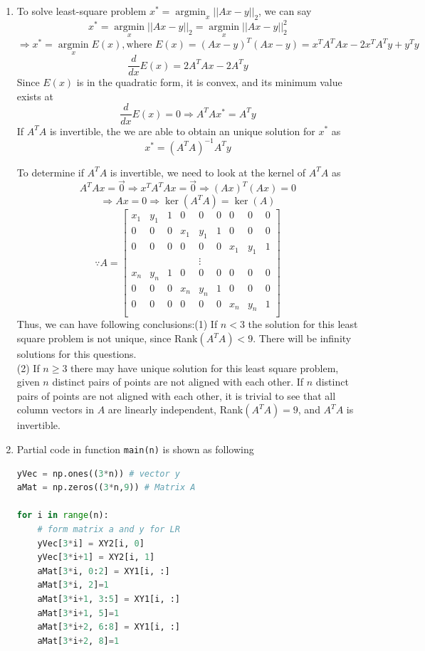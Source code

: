 \documentclass[12pt]{article}
\begin{document}
\begin{enumerate}
\begin{enumerate}
			\item To solve least-square problem $x^*=\operatorname*{argmin}_x||Ax-y||_2$, we can say
			$$x^*=\operatorname*{argmin}_x||Ax-y||_2=\operatorname*{argmin}_x||Ax-y||_2^2$$
			$$\Rightarrow x^*=\operatorname*{argmin}_xE(x), \text{where }E(x)= (Ax-y)^T(Ax-y)= x^TA^TAx-2x^TA^Ty+y^Ty$$
			$$\frac{d}{dx}E(x)=2A^TAx-2A^Ty$$
			Since $E(x)$ is in the quadratic form, it is convex, and its minimum value exists at 
			$$\frac{d}{dx}E(x)=0\Rightarrow A^TAx^*=A^Ty$$
			If $A^TA$ is invertible, the we are able to obtain an unique solution for $x^*$ as
			$$x^*=(A^TA)^{-1}A^Ty$$
			
			To determine if $A^TA$ is invertible, we need to look at the kernel of $A^TA$ as
			$$A^TAx=\vec{0}\Rightarrow x^TA^TAx=\vec{0}\Rightarrow(Ax)^T(Ax)=0$$
			$$\Rightarrow Ax=0\Rightarrow \ker(A^TA)=\ker(A)$$
			$$\because A=\begin{bmatrix}
			x_1 & y_1 & 1 & 0 & 0 & 0 & 0 & 0 & 0\\
			0 & 0 & 0 & x_1 & y_1 & 1 &  0 & 0 & 0\\
			0 & 0 & 0 & 0 & 0 & 0 & x_1 & y_1 & 1 \\
			&&&&\vdots\\
			x_n & y_n & 1 & 0 & 0 & 0 & 0 & 0 & 0\\
			0 & 0 & 0 & x_n & y_n & 1 &  0 & 0 & 0\\
			0 & 0 & 0 & 0 & 0 & 0 & x_n & y_n & 1 \\
			\end{bmatrix}$$
			Thus, we can have following conclusions:(1) If $n<3$ the solution for this least square problem is not unique, since Rank$(A^TA)<9$. There will be infinity solutions for this questions.\\
			(2) If $n\geq 3$ there may have unique solution for this least square problem, given $n$ distinct pairs of points are not aligned with each other. If $n$ distinct pairs of points are not aligned with each other, it is trivial to see that all column vectors in $A$ are linearly independent, Rank$(A^TA)=9$, and $A^TA$ is invertible. \\
					
			\item Partial code in function \texttt{main(n)} is shown as following
			\begin{lstlisting}[language=Python]
yVec = np.ones((3*n)) # vector y
aMat = np.zeros((3*n,9)) # Matrix A

for i in range(n): 
	# form matrix a and y for LR
	yVec[3*i] = XY2[i, 0]
	yVec[3*i+1] = XY2[i, 1]
	aMat[3*i, 0:2] = XY1[i, :]
	aMat[3*i, 2]=1
	aMat[3*i+1, 3:5] = XY1[i, :]
	aMat[3*i+1, 5]=1
	aMat[3*i+2, 6:8] = XY1[i, :]
	aMat[3*i+2, 8]=1


\end{lstlisting}
\end{enumerate}
\end{enumerate}
\end{document}
